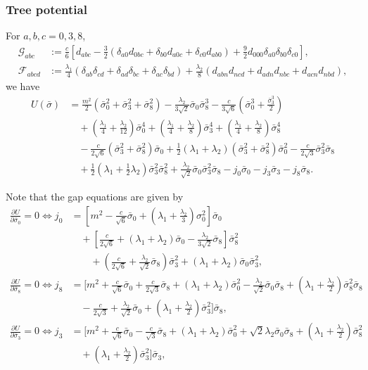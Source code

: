 \documentclass[a4paper,preprint,superscriptaddress,preprintnumbers,nofootinbib]{revtex4}
\newcommand{\al}[1]{\begin{align}#1\end{align}}
\newcommand{\nn}{\nonumber\\}
\newcommand{\p}{\partial}
\newcommand{\fn}[1]{\!\left(#1\right)}
\begin{document}
\begin{appendix}
\subsubsection{Tree potential}
For $a,b,c=0,3,8$,
\al{
{\mathcal G}_{abc}&:=\frac{c}{6} 
\left[d_{abc}
-\frac{3}{2}(\delta_{a0}d_{0bc}+\delta_{b0}d_{a0c}+\delta_{c0}d_{ab0})
+\frac{9}{2}d_{000}\delta_{a0}\delta_{b0}\delta_{c0}
\right],\\
{\mathcal F}_{abcd}&:= \frac{\lambda_1}{4}(\delta_{ab}\delta_{cd}+\delta_{ad}\delta_{bc}+\delta_{ac}\delta_{bd})
+\frac{\lambda_2}{8}(d_{abn}d_{ncd}+d_{adn}d_{nbc}+d_{acn}d_{nbd}),
}
we have
\al{
U\fn{\bar \sigma}&=\frac{m^2}{2}(\bar \sigma_0^2+\bar \sigma_3^2+\bar \sigma_8^2)
-\frac{\lambda_2}{3\sqrt{2}}\bar \sigma_0\bar \sigma_8^3
-\frac{c}{3\sqrt{6}}\left(\bar \sigma_0^3+\frac{\bar \sigma_3^3}{2}\right)\nn
&\quad +\left( \frac{\lambda_1}{4}+\frac{\lambda_2}{12}\right) \bar \sigma_0^4
+\left( \frac{\lambda_1}{4}+\frac{\lambda_2}{8}\right) \bar \sigma_3^4
+\left( \frac{\lambda_1}{4}+\frac{\lambda_2}{8}\right) \bar \sigma_8^4\nn
&\quad -\frac{c}{2\sqrt{6}}(\bar \sigma_3^2+\bar \sigma_8^2)\bar \sigma_0
+\frac{1}{2}(\lambda_1+\lambda_2)(\bar \sigma_3^2+\bar \sigma_8^2)\bar \sigma_0^2
-\frac{c}{2\sqrt{3}}\bar \sigma_3^2\bar \sigma_8\nn
&\quad +\frac{1}{2}\left( \lambda_1+\frac{1}{2}\lambda_2\right)\bar \sigma_3^2\bar \sigma_8^2
+\frac{\lambda_2}{\sqrt{2}}\bar \sigma_0\bar \sigma_3^2\bar \sigma_8
-j_0\bar \sigma_0-j_3\bar \sigma_3-j_8\bar \sigma_8.
}

Note that the gap equations are given by
\al{
\frac{\p U}{\p \bar \sigma_0}=0\iff
j_0&=\left[m^2 -\frac{c}{\sqrt{6}}\bar \sigma_0+\left(\lambda_1+\frac{\lambda_2}{3}\right)\sigma_0^2\right]\bar \sigma_0\nn
&\quad +\left[
\frac{c}{2\sqrt{6}}+(\lambda_1+\lambda_2)\bar \sigma_0 -\frac{\lambda_2}{3\sqrt{2}}\bar \sigma_8
\right]\bar \sigma_8^2\nn
&\qquad +\left( \frac{c}{2\sqrt{6}} +\frac{\lambda_2}{\sqrt{2}}\bar \sigma_8\right)\bar \sigma_3^2
+(\lambda_1+\lambda_2)\bar \sigma_0\bar \sigma_3^2,
\label{gapequ0}
\\
%
\frac{\p U}{\p \bar \sigma_8}=0\iff
j_8&=\bigg[ 
m^2+\frac{c}{\sqrt{6}}\bar \sigma_0+\frac{c}{2\sqrt{3}}\bar \sigma_8
+(\lambda_1+\lambda_2)\bar \sigma_0^2-\frac{\lambda_2}{\sqrt{2}}\bar \sigma_0\bar \sigma_8+\left(\lambda_1+\frac{\lambda_2}{2}\right)\bar \sigma_8^2
\bar \sigma_8\nn
&\quad -\frac{c}{2\sqrt{3}}
+\frac{\lambda_2}{\sqrt{2}}\bar \sigma_0 
+\left( \lambda_1 +\frac{\lambda_2}{2} \right)\bar \sigma_3^2\bigg]\bar \sigma_8,\\
%
\frac{\p U}{\p \bar \sigma_3}=0\iff
j_3&=\bigg[ 
m^2 +\frac{c}{\sqrt{6}}\bar \sigma_0 -\frac{c}{\sqrt{3}}\bar \sigma_8
+(\lambda_1+\lambda_2)\bar \sigma_0^2
+\sqrt{2}\lambda_2\bar \sigma_0\bar \sigma_8
+\left(\lambda_1+\frac{\lambda_2}{2}\right)\bar \sigma_8^2\nn
&\quad +\left(\lambda_1+\frac{\lambda_2}{2}\right)\bar \sigma_3^2
\bigg]\bar \sigma_3,
}

\end{appendix}
\end{document}
